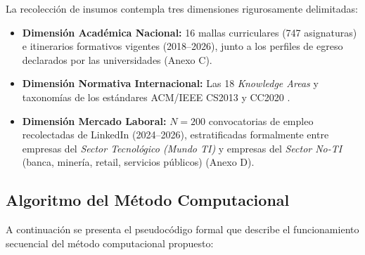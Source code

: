 La recolección de insumos contempla tres dimensiones rigurosamente delimitadas:
\begin{itemize}
	\item \textbf{Dimensión Académica Nacional:} 16 mallas curriculares (747 asignaturas) e itinerarios formativos vigentes (2018–2026), junto a los perfiles de egreso declarados por las universidades (Anexo C).
	\item \textbf{Dimensión Normativa Internacional:} Las 18 \textit{Knowledge Areas} y taxonomías de los estándares ACM/IEEE CS2013 y CC2020 \citep{cc2020_task_force_computing_2020}.
	\item \textbf{Dimensión Mercado Laboral:} $N = 200$ convocatorias de empleo recolectadas de LinkedIn (2024–2026), estratificadas formalmente entre empresas del \textit{Sector Tecnológico (Mundo TI)} y empresas del \textit{Sector No-TI} (banca, minería, retail, servicios públicos) (Anexo D).
\end{itemize}

\subsection{Algoritmo del Método Computacional}
\label{sec:algorithm_pseudocode}

A continuación se presenta el pseudocódigo formal que describe el funcionamiento secuencial del método computacional propuesto:

\vspace{0.3cm}

